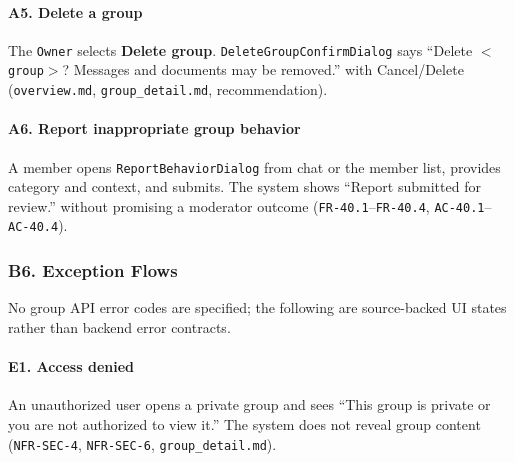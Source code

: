 \documentclass[12pt]{article}
\begin{document}
\hypertarget{sec:a5-delete-a-group}{}
\paragraph*{A5. Delete a group}
\par\medskip

The \texttt{Owner} selects \textbf{Delete group}. \texttt{DeleteGroupConfirmDialog} says “Delete \texttt{$<$group$>$}? Messages and documents may be removed.” with Cancel/Delete (\texttt{overview.md}, \texttt{group\_detail.md}, recommendation).
\par\medskip

\hypertarget{sec:a6-report-inappropriate-group-behavior}{}
\paragraph*{A6. Report inappropriate group behavior}
\par\medskip

A member opens \texttt{ReportBehaviorDialog} from chat or the member list, provides category and context, and submits. The system shows “Report submitted for review.” without promising a moderator outcome (\texttt{FR-40.1}--\texttt{FR-40.4}, \texttt{AC-40.1}--\texttt{AC-40.4}).
\par\medskip

\hypertarget{sec:b6-exception-flows}{}
\subsubsection*{B6. Exception Flows}
\par\medskip

No group API error codes are specified; the following are source-backed UI states rather than backend error contracts.
\par\medskip

\hypertarget{sec:e1-access-denied}{}
\paragraph*{E1. Access denied}
\par\medskip

An unauthorized user opens a private group and sees “This group is private or you are not authorized to view it.” The system does not reveal group content (\texttt{NFR-SEC-4}, \texttt{NFR-SEC-6}, \texttt{group\_detail.md}).
\par\medskip
\end{document}
